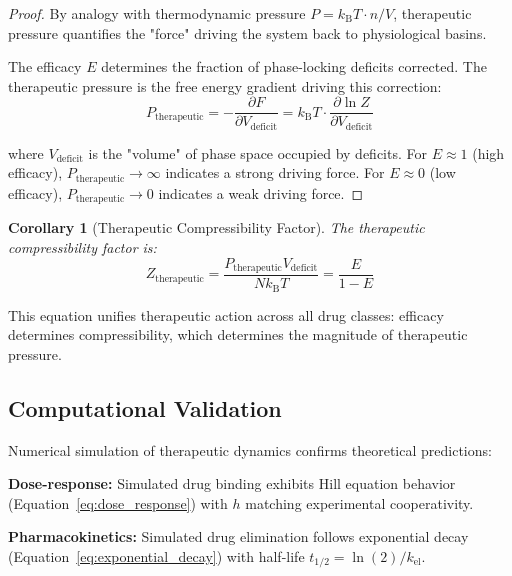 \documentclass[11pt,twocolumn,a4paper]{article}
\newtheorem{corollary}[theorem]{Corollary}
\theoremstyle{definition}
\theoremstyle{remark}
\newcommand{\kB}{k_{\mathrm{B}}}
\begin{document}
\begin{proof}
By analogy with thermodynamic pressure $P = \kB T \cdot n/V$, therapeutic pressure quantifies the "force" driving the system back to physiological basins.

The efficacy $E$ determines the fraction of phase-locking deficits corrected. The therapeutic pressure is the free energy gradient driving this correction:
\begin{equation}
P_{\mathrm{therapeutic}} = -\frac{\partial F}{\partial V_{\mathrm{deficit}}} = \kB T \cdot \frac{\partial \ln Z}{\partial V_{\mathrm{deficit}}}
\end{equation}

where $V_{\mathrm{deficit}}$ is the "volume" of phase space occupied by deficits. For $E \approx 1$ (high efficacy), $P_{\mathrm{therapeutic}} \to \infty$ indicates a strong driving force. For $E \approx 0$ (low efficacy), $P_{\mathrm{therapeutic}} \to 0$ indicates a weak driving force.
\end{proof}

\begin{corollary}[Therapeutic Compressibility Factor]
\label{cor:therapeutic_compressibility}
The therapeutic compressibility factor is:
\begin{equation}
Z_{\mathrm{therapeutic}} = \frac{P_{\mathrm{therapeutic}} V_{\mathrm{deficit}}}{N\kB T} = \frac{E}{1 - E}
\label{eq:therapeutic_compressibility}
\end{equation}
\end{corollary}

This equation unifies therapeutic action across all drug classes: efficacy determines compressibility, which determines the magnitude of therapeutic pressure.



\subsection{Computational Validation}

Numerical simulation of therapeutic dynamics confirms theoretical predictions:

\textbf{Dose-response:} Simulated drug binding exhibits Hill equation behavior (Equation~\eqref{eq:dose_response}) with $h$ matching experimental cooperativity.

\textbf{Pharmacokinetics:} Simulated drug elimination follows exponential decay (Equation~\eqref{eq:exponential_decay}) with half-life $t_{1/2} = \ln(2)/k_{\mathrm{el}}$.
\end{document}
